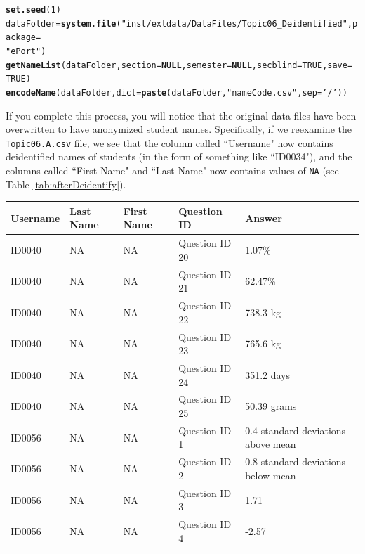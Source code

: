 \documentclass[11pt,a4paper,oldfontcommands,openany]{memoir}
\makeatletter
\newcommand{\hlnum}[1]{\textcolor[rgb]{0.686,0.059,0.569}{#1}}%
\newcommand{\hlstr}[1]{\textcolor[rgb]{0.192,0.494,0.8}{#1}}%
\newcommand{\hlstd}[1]{\textcolor[rgb]{0.345,0.345,0.345}{#1}}%
\newcommand{\hlkwa}[1]{\textcolor[rgb]{0.161,0.373,0.58}{\textbf{#1}}}%
\newcommand{\hlkwb}[1]{\textcolor[rgb]{0.69,0.353,0.396}{#1}}%
\newcommand{\hlkwc}[1]{\textcolor[rgb]{0.333,0.667,0.333}{#1}}%
\newcommand{\hlkwd}[1]{\textcolor[rgb]{0.737,0.353,0.396}{\textbf{#1}}}%
\newenvironment{kframe}{%
 \def\at@end@of@kframe{}%
 \ifinner\ifhmode%
  \def\at@end@of@kframe{\end{minipage}}%
  \begin{minipage}{\columnwidth}%
 \fi\fi%
 \def\FrameCommand##1{\hskip\@totalleftmargin \hskip-\fboxsep
 \colorbox{shadecolor}{##1}\hskip-\fboxsep
     \hskip-\linewidth \hskip-\@totalleftmargin \hskip\columnwidth}%
 \MakeFramed {\advance\hsize-\width
   \@totalleftmargin\z@ \linewidth\hsize
   \@setminipage}}%
 {\par\unskip\endMakeFramed%
 \at@end@of@kframe}
\newenvironment{knitrout}{}{} %
\numberwithin{equation}{section} %
\makeatother
\begin{document}
\begin{knitrout}
\color{fgcolor}\begin{kframe}
\begin{alltt}
\hlkwd{set.seed}\hlstd{(}\hlnum{1}\hlstd{)}
\hlstd{dataFolder} \hlkwb{=} \hlkwd{system.file}\hlstd{(}\hlstr{"inst/extdata/DataFiles/Topic06_Deidentified"}\hlstd{,} \hlkwc{package} \hlstd{=}
  \hlstr{"ePort"}\hlstd{)}
\hlkwd{getNameList}\hlstd{(dataFolder,} \hlkwc{section} \hlstd{=} \hlkwa{NULL}\hlstd{,} \hlkwc{semester} \hlstd{=} \hlkwa{NULL}\hlstd{,} \hlkwc{secblind} \hlstd{=} \hlnum{TRUE}\hlstd{,} \hlkwc{save} \hlstd{=}
  \hlnum{TRUE}\hlstd{)}
\hlkwd{encodeName}\hlstd{(dataFolder,} \hlkwc{dict} \hlstd{=} \hlkwd{paste}\hlstd{(dataFolder,} \hlstr{"nameCode.csv"}\hlstd{,} \hlkwc{sep} \hlstd{=} \hlstr{'/'}\hlstd{))}
\end{alltt}
\end{kframe}
\end{knitrout}

If you complete this process, you will notice that the original data files have been overwritten to have anonymized student names. Specifically, if we reexamine the \texttt{Topic06.A.csv} file, we see that the column called ``Username" now contains deidentified names of students (in the form of something like ``ID0034"), and the columns called ``First Name" and ``Last Name" now contains values of \texttt{NA} (see Table \ref{tab:afterDeidentify}).

\begin{center}
\label{tab:afterDeidentify}
\begin{tabular} { | l | l | l | l | l |}
\hline \textbf{Username} & \textbf{Last Name} & \textbf{First Name} & \textbf{Question ID} & \textbf{Answer} \\
\hline
ID0040 & NA & NA & Question ID 20 & 1.07\% \\
\hline
ID0040 & NA & NA & Question ID 21 & 62.47\% \\
\hline
ID0040 & NA & NA & Question ID 22 & 738.3 kg \\
\hline
ID0040 & NA & NA & Question ID 23 & 765.6 kg\\
\hline
ID0040 & NA & NA & Question ID 24 & 351.2 days \\
\hline
ID0040 & NA & NA & Question ID 25 & 50.39 grams \\
\hline
ID0056 & NA & NA & Question ID 1 & 0.4 standard deviations above mean \\
\hline
ID0056 & NA & NA & Question ID 2 & 0.8 standard deviations below mean \\
\hline
ID0056 & NA & NA & Question ID 3 & 1.71 \\
\hline
ID0056 & NA & NA & Question ID 4 & -2.57 \\
\hline
\end{tabular}
\end{center}
\end{document}
